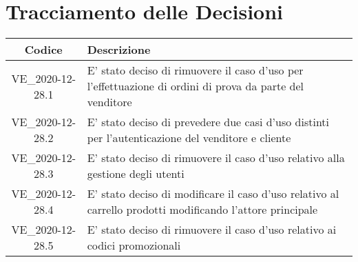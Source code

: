 \section*{Tracciamento delle Decisioni}

\begin{center}
	\begin{longtable}{|c|p{14.5cm}|}
	\hline
	\rowcolor{lighter-grayer}
	\textbf{Codice} & \textbf{Descrizione} \\
	\hline
	\endfirsthead

	\hline
	VE\_2020-12-28.1 & E' stato deciso di rimuovere il caso d'uso per l'effettuazione di ordini di prova da parte del venditore \\
	\hline
	\hline
	VE\_2020-12-28.2 & E' stato deciso di prevedere due casi d'uso distinti per l'autenticazione del venditore e cliente \\
	\hline
	\hline
	VE\_2020-12-28.3 & E' stato deciso di rimuovere il caso d'uso relativo alla gestione degli utenti\\
	\hline
	\hline
	VE\_2020-12-28.4 & E' stato deciso di modificare il caso d'uso relativo al carrello prodotti modificando l'attore principale\\
	\hline
	\hline
	VE\_2020-12-28.5 & E' stato deciso di rimuovere il caso d'uso relativo ai codici promozionali \\
	\hline


	\end{longtable}
\end{center}